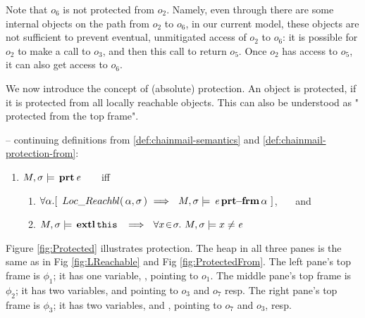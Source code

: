 { 

Note that $o_6$ is not protected from $o_2$. 
Namely, even through there are some internal objects on the path from $o_2$ to $o_6$, in our current model, these objects are not sufficient to prevent eventual, unmitigated access of $o_2$ to $o_6$: it is possible for $o_2$ to make a call to $o_3$, and then this call to return $o_5$. Once $o_2$ has access to $o_5$, it can also get access to $o_6$. 

\vspace{.1in}

We now introduce the concept of (absolute) protection.
An object is protected, if it is protected from all locally reachable objects. This can also be understood as 
" protected from the top frame". 
 
\begin{definition} 
\label{def:chainmail-protection}
\label{sect:semantics:assert:prt}
-- continuing definitions from \ref{def:chainmail-semantics} and \ref{def:chainmail-protection-from}:
\begin{enumerate}
\item
$M , \sigma \models {\ensuremath{\, \mathbf{prt}}\, \mathit{e}\, }$  \ \ \ iff \ \ \ 
\begin{enumerate}
\item
{$\forall \alpha.[ \  \LRelevant {\alpha}  {\sigma}\ \Longrightarrow \ \  \satisfiesA{M}{\sigma}{\protectedFrom{\re} {{\alpha}}}\ ] $}, \ \ \ and 
\item
$\satisfiesA{M}{\sigma}{\external{\prg{this}}}\ \ \Longrightarrow\ \ \forall x\!\in\! \sigma.\ \satisfiesA{M}{\sigma}{x\neq \re}$
\end{enumerate}
\end{enumerate}
\end{definition} 
 
  Figure \ref{fig:Protected} illustrates %
  protection. The heap in all three panes is the same as in  Fig \ref{fig:LReachable} and 
 Fig \ref{fig:ProtectedFrom}. The left pane's  top frame is $\phi_1$; it has  one variable, , pointing to $o_1$.  The middle pane's  top frame is $\phi_2$; it has two  variables,    and  pointing to $o_3$ and  $o_7$ resp. The right pane's  top frame is $\phi_3$; it has two  variables,   and , pointing to $o_7$ and $o_3$, resp.  

}
